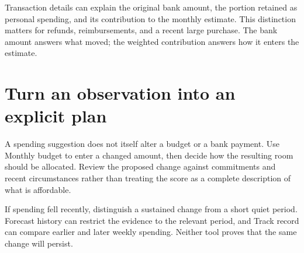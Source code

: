 Transaction details can explain the original bank amount, the portion retained as personal spending, and its contribution to the monthly estimate. This distinction matters for refunds, reimbursements, and a recent large purchase. The bank amount answers what moved; the weighted contribution answers how it enters the estimate.

\section{Turn an observation into an explicit plan}
A spending suggestion does not itself alter a budget or a bank payment. Use Monthly budget to enter a changed amount, then decide how the resulting room should be allocated. Review the proposed change against commitments and recent circumstances rather than treating the score as a complete description of what is affordable.

If spending fell recently, distinguish a sustained change from a short quiet period. Forecast history can restrict the evidence to the relevant period, and Track record can compare earlier and later weekly spending. Neither tool proves that the same change will persist.


